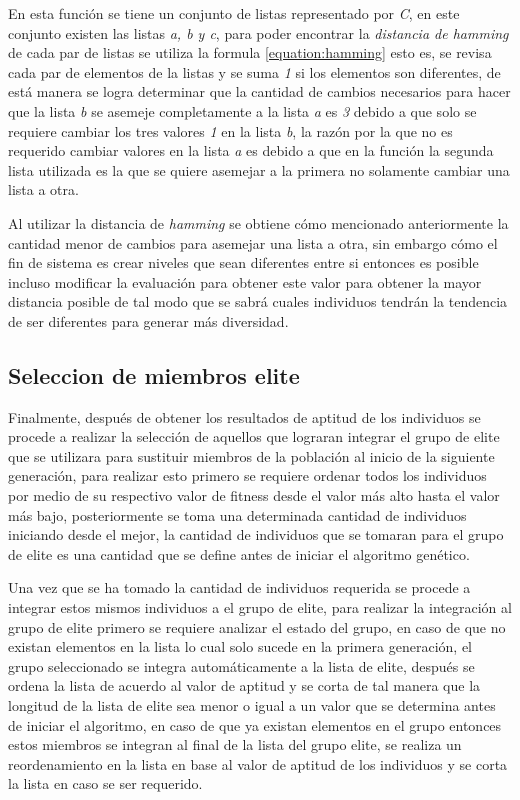 En esta función se tiene un conjunto de listas representado por \textit{C}, en
este conjunto existen las listas \textit{a, b y c}, para poder encontrar la
\textit{distancia de hamming} de cada par de listas se utiliza la formula
\ref{equation:hamming} esto es, se revisa cada par de elementos de la listas y
se suma \textit{1} si los elementos son diferentes, de está manera se logra
determinar que la cantidad de cambios necesarios para hacer que la lista
\textit{b} se asemeje completamente a la lista \textit{a} es \textit{3} debido a
que solo se requiere cambiar los tres valores \textit{1} en la lista \textit{b},
la razón por la que no es requerido cambiar valores en la lista \textit{a} es
debido a que en la función la segunda lista utilizada es la que se quiere
asemejar a la primera no solamente cambiar una lista a otra.

Al utilizar la distancia de \textit{hamming} se obtiene cómo mencionado
anteriormente la cantidad menor de cambios para asemejar una lista a otra, sin
embargo cómo el fin de sistema es crear niveles que sean diferentes entre si
entonces es posible incluso modificar la evaluación para obtener este valor para
obtener la mayor distancia posible de tal modo que se sabrá cuales individuos
tendrán la tendencia de ser diferentes para generar más diversidad.

\subsection{Seleccion de miembros elite}
\label{subsection:elite_selection}

Finalmente, después de obtener los resultados de aptitud de los individuos se
procede a realizar la selección de aquellos que lograran integrar el grupo de
elite que se utilizara para sustituir miembros de la población al inicio de la
siguiente generación, para realizar esto primero se requiere ordenar todos los
individuos por medio de su respectivo valor de fitness desde el valor más alto
hasta el valor más bajo, posteriormente se toma una determinada cantidad de
individuos iniciando desde el mejor, la cantidad de individuos que se tomaran
para el grupo de elite es una cantidad que se define antes de iniciar el
algoritmo genético.

Una vez que se ha tomado la cantidad de individuos requerida se procede a
integrar estos mismos individuos a el grupo de elite, para realizar la
integración al grupo de elite primero se requiere analizar el estado del grupo,
en caso de que no existan elementos en la lista lo cual solo sucede en la
primera generación, el grupo seleccionado se integra automáticamente a la lista
de elite, después se ordena la lista de acuerdo al valor de aptitud y se corta de
tal manera que la longitud de la lista de elite sea menor o igual a un valor que
se determina antes de iniciar el algoritmo, en caso de que ya existan elementos
en el grupo entonces estos miembros se integran al final de la lista del grupo
elite, se realiza un reordenamiento en la lista en base al valor de aptitud de
los individuos y se corta la lista en caso se ser requerido.

